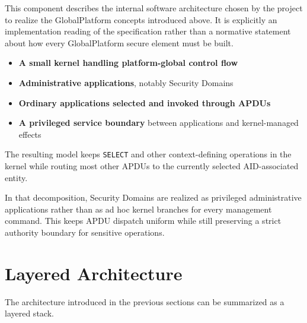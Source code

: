 This component describes the internal software architecture chosen by the
project to realize the GlobalPlatform concepts introduced above. It is
explicitly an implementation reading of the specification rather than a
normative statement about how every GlobalPlatform secure element must be built.

\begin{itemize}
\item \textbf{A small kernel handling platform-global control flow}
\item \textbf{Administrative applications}, notably Security Domains
\item \textbf{Ordinary applications selected and invoked through APDUs}
\item \textbf{A privileged service boundary} between applications and
  kernel-managed effects
\end{itemize}

The resulting model keeps \texttt{SELECT} and other context-defining
operations in the kernel while routing most other APDUs to the currently
selected AID-associated entity.

In that decomposition, Security Domains are realized as privileged
administrative applications rather than as ad hoc kernel branches for
every management command. This keeps APDU dispatch uniform while still
preserving a strict authority boundary for sensitive operations.


\section{Layered Architecture}

The architecture introduced in the previous sections can be summarized as a
layered stack. 

